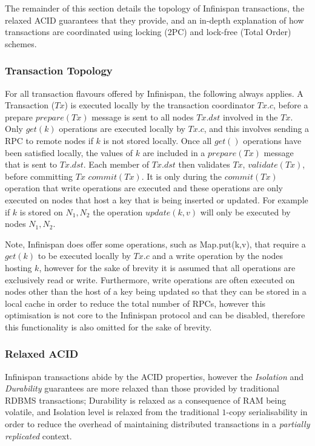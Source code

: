     The remainder of this section details the topology of Infinispan transactions, the relaxed ACID guarantees that they provide, and an in-depth explanation of how transactions are coordinated using locking (2PC) and lock-free (Total Order) schemes. 
    
		\subsubsection{Transaction Topology}
		For all transaction flavours offered by Infinispan, the following always applies.  A Transaction ($Tx$) is executed locally by the transaction coordinator $Tx.c$, before a prepare $prepare(Tx)$ message is sent to all nodes $Tx.dst$ involved in the $Tx$.  Only $get(k)$ operations are executed locally by $Tx.c$, and this involves sending a RPC to remote nodes if $k$ is not stored locally.  Once all $get()$ operations have been satisfied locally, the values of $k$ are included in a $prepare(Tx)$ message that is sent to $Tx.dst$.  Each member of $Tx.dst$ then validates $Tx$, $validate(Tx)$, before committing $Tx$ $commit(Tx)$.  It is only during the $commit(Tx)$ operation that write operations are executed and these operations are only executed on nodes that host a key that is being inserted or updated.  For example if $k$ is stored on $N_1, N_2$ the operation $update(k, v)$ will only be executed by nodes $N_1, N_2$.  
		
		Note, Infinispan does offer some operations, such as \textsf{Map.put(k,v)}, that require a $get(k)$ to be executed locally by $Tx.c$ and a write operation by the nodes hosting $k$, however for the sake of brevity it is assumed that all operations are exclusively read or write.  Furthermore, write operations are often executed on nodes other than the host of a key being updated so that they can be stored in a local cache in order to reduce the total number of RPCs, however this optimisation is not core to the Infinispan protocol and can be disabled, therefore this functionality is also omitted for the sake of brevity.  
    
	    \subsubsection{Relaxed ACID}
	    Infinispan transactions abide by the ACID\citep{Haerder:1983:PTD:289.291} properties, however the \emph{Isolation} and \emph{Durability} guarantees are more relaxed than those provided by traditional RDBMS transactions; Durability is relaxed as a consequence of RAM being volatile, and Isolation level is relaxed from the traditional $1$-copy serialisability in order to reduce the overhead of maintaining distributed transactions in a \emph{partially replicated} context.  
	    

